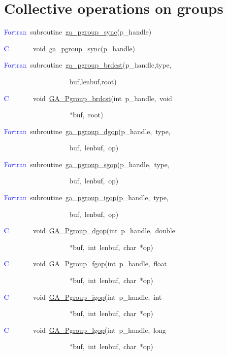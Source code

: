 \section{Collective operations on groups}
\begin{lyxcode}
\textcolor{blue}{Fortran}~subroutine~\href{http://www.emsl.pnl.gov/docs/global/ga_ops.html\#GA_PGROUP_SYNC}{ga\_{}pgroup\_{}sync}(p\_handle)

\textcolor{blue}{C}~~~~~~~void~\href{http://www.emsl.pnl.gov/docs/global/ga_ops.html\#GA_PGROUP_SYNC}{ga\_{}pgroup\_{}sync}(p\_handle)

\textcolor{blue}{Fortran}~subroutine~\href{http://www.emsl.pnl.gov/docs/global/ga_ops.html\#GA_PGROUP_BRDCST}{ga\_{}pgroup\_{}brdcst}(p\_handle,type,

~~~~~~~~~~~~~~~~~~~buf,lenbuf,root)

\textcolor{blue}{C}~~~~~~~void~\href{http://www.emsl.pnl.gov/docs/global/ga_ops.html\#GA_PGROUP_BRDCST}{GA\_{}Pgroup\_{}brdcst}(int~p\_handle,~void~

~~~~~~~~~~~~~~~~~~~{*}buf,~root)

\textcolor{blue}{Fortran}~subroutine~\href{http://www.emsl.pnl.gov/docs/global/ga_ops.html\#GA_PGROUP_DGOP}{ga\_{}pgroup\_{}dgop}(p\_handle,~type,~

~~~~~~~~~~~~~~~~~~~buf,~lenbuf,~op)

\textcolor{blue}{Fortran}~subroutine~\href{http://www.emsl.pnl.gov/docs/global/ga_ops.html\#GA_PGROUP_SGOP}{ga\_{}pgroup\_{}sgop}(p\_handle,~type,~

~~~~~~~~~~~~~~~~~~~buf,~lenbuf,~op)

\textcolor{blue}{Fortran}~subroutine~\href{http://www.emsl.pnl.gov/docs/global/ga_ops.html\#GA_PGROUP_IGOP}{ga\_{}pgroup\_{}igop}(p\_handle,~type,~

~~~~~~~~~~~~~~~~~~~buf,~lenbuf,~op)

\textcolor{blue}{C}~~~~~~~void~\href{http://www.emsl.pnl.gov/docs/global/c_nga_ops.html\#GA_PGROUP_DGOP}{GA\_{}Pgroup\_{}dgop}(int~p\_handle,~double~

~~~~~~~~~~~~~~~~~~~{*}buf,~int~lenbuf,~char~{*}op)

\textcolor{blue}{C}~~~~~~~void~\href{http://www.emsl.pnl.gov/docs/global/c_nga_ops.html\#GA_PGROUP_FGOP}{GA\_{}Pgroup\_{}fgop}(int~p\_handle,~float~

~~~~~~~~~~~~~~~~~~~{*}buf,~int~lenbuf,~char~{*}op)

\textcolor{blue}{C}~~~~~~~void~\href{http://www.emsl.pnl.gov/docs/global/c_nga_ops.html\#GA_PGROUP_IGOP}{GA\_{}Pgroup\_{}igop}(int~p\_handle,~int~

~~~~~~~~~~~~~~~~~~~{*}buf,~int~lenbuf,~char~{*}op)

\textcolor{blue}{C}~~~~~~~void~\href{http://www.emsl.pnl.gov/docs/global/c_nga_ops.html\#GA_PGROUP_LGOP}{GA\_{}Pgroup\_{}lgop}(int~p\_handle,~long~

~~~~~~~~~~~~~~~~~~~{*}buf,~int~lenbuf,~char~{*}op)
\end{lyxcode}
